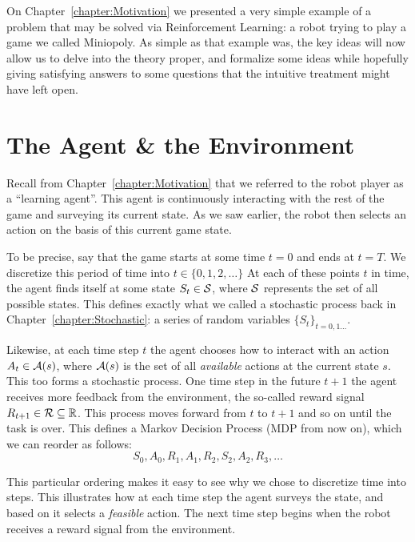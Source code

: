 
\label{chapter:ReinforcementLearning}

On Chapter~\ref{chapter:Motivation} we presented a very simple example of a
problem that may be solved via Reinforcement Learning: a robot trying to play a
game we called Miniopoly. As simple as that example was, the key ideas will now
allow us to delve into the theory proper, and formalize some ideas while
hopefully giving satisfying answers to some questions that the intuitive
treatment might have left open.

\section{The Agent \& the Environment} Recall from
Chapter~\ref{chapter:Motivation} that we referred to the robot player as a
``learning agent''. This agent is continuously interacting with the rest of the
game and surveying its current state. As we saw earlier, the robot then selects
an action on the basis of this current game state.

To be precise, say that the game starts at some time $t=0$ and ends at $t=T$. We
discretize this period of time into $t \in \{0, 1, 2, \ldots \}$ At each of
these points $t$ in time, the agent finds itself at some state $S_t \in
\mathcal{S}$, where $\mathcal{S}$ represents the set of all possible states. This
defines exactly what we called a stochastic process back in 
Chapter~\ref{chapter:Stochastic}: a series of random variables $\{ S_t \}_{t =
0, 1 \ldots}$. 

Likewise, at each time step $t$ the agent chooses how to interact with an action
$A_t \in \mathcal{A}(s)$, where $\mathcal{A}(s)$ is the set of all \textit{available}
actions at the current state $s$. This too forms a stochastic process. One time
step in the future $t+1$ the agent receives more feedback from the environment,
the so-called reward signal $R_{t+1} \in \mathcal{R} \subseteq \mathbb{R}$. This process
moves forward from $t$ to $t+1$ and so on until the task is over. This defines a
Markov Decision Process (MDP from now on), which we can reorder as follows:
\begin{equation} S_0, A_0, R_1, A_1, R_2, S_2, A_2, R_3, \ldots \end{equation}

This particular ordering makes it easy to see why we chose to discretize time
into steps. This illustrates how at each time step the agent surveys the state,
and based on it selects a \textit{feasible} action. The next time step begins
when the robot receives a reward signal from the environment. 

